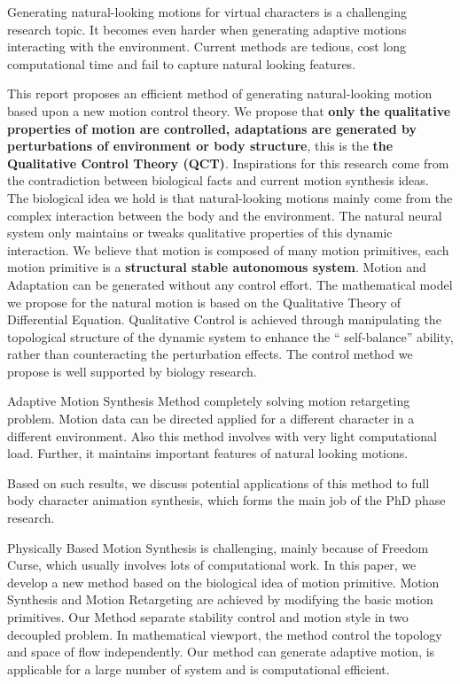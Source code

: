 


\begin{abstracts}        %

Generating natural-looking motions for virtual characters is a challenging research topic. 
It becomes even harder when generating adaptive motions interacting with the environment. 
Current methods are tedious, cost long computational time and fail to capture natural looking features.

This report proposes an efficient method of generating natural-looking motion based upon a new motion control theory.
We propose that \textbf{only the qualitative properties of motion are controlled, adaptations are generated by perturbations of environment or body structure}, this is the  \textbf{the Qualitative Control Theory (QCT)}.
Inspirations for this research come from the contradiction between biological facts and current motion synthesis ideas. 
The biological idea we hold  is that natural-looking motions mainly come from the complex interaction between the body and the environment. 
The natural neural system only maintains or tweaks qualitative properties of this dynamic interaction. 
We believe that motion is composed of many motion primitives, each motion primitive is a \textbf{structural stable autonomous system}.
Motion and Adaptation can be generated without any control effort.
The mathematical model we propose for the natural motion is based on the Qualitative Theory of Differential Equation.
Qualitative Control is achieved through manipulating the topological structure of the dynamic system to enhance the `` self-balance'' ability, rather than counteracting the perturbation effects. 
The control method we propose is well supported by biology research.

Adaptive Motion Synthesis Method completely solving  motion retargeting problem.
Motion data can be directed applied for a different character in a different environment.
Also this method involves with very light computational load.
Further, it maintains important features of natural looking motions.

Based on such results, 
we discuss potential applications of this method to full body character animation synthesis,
which forms the main job of the PhD phase research.



Physically Based Motion Synthesis is challenging, mainly because of Freedom Curse, which usually involves lots of computational work. 
In this paper, we develop a new method based on the biological idea of motion primitive. 
Motion Synthesis and Motion Retargeting are achieved by modifying the basic motion primitives. 
Our Method separate stability control and motion style in two decoupled problem. 
In mathematical viewport,  the method control the topology and space of flow independently.
Our method can generate adaptive motion, is applicable for a large number of system and is computational efficient.


\end{abstracts}




